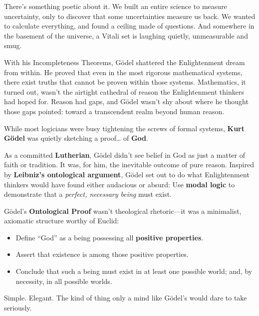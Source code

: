 There’s something poetic about it. We built an entire science to measure uncertainty, only to discover that some uncertainties measure us back. We wanted to calculate everything, and found a ceiling made of questions. And somewhere in the basement of the universe, a Vitali set is laughing quietly, unmeasurable and smug.

With his Incompleteness Theorems, Gödel shattered the Enlightenment dream from within. He proved that even in the most rigorous mathematical systems, there exist truths that cannot be proven within those systems. Mathematics, it turned out, wasn’t the airtight cathedral of reason the Enlightenment thinkers had hoped for. Reason had gaps, and Gödel wasn’t shy about where he thought those gaps pointed: toward a transcendent realm beyond human reason.

\begin{tcolorbox}[colback=blue!5!white, colframe=blue!50!black, title=Historical Sidebar: Truth vs Games]

While most logicians were busy tightening the screws of formal systems, \textbf{Kurt Gödel} was quietly sketching a proof\ldots{} of \textbf{God}.

\medskip

As a committed \textbf{Lutherian}, Gödel didn’t see belief in God as just a matter of faith or tradition. It was, for him, the inevitable outcome of pure reason. Inspired by \textbf{Leibniz’s ontological argument}, Gödel set out to do what Enlightenment thinkers would have found either audacious or absurd: Use \textbf{modal logic} to demonstrate that a \emph{perfect, necessary being} must exist.

\medskip

Gödel’s \textbf{Ontological Proof} wasn’t theological rhetoric—it was a minimalist, axiomatic structure worthy of Euclid:

\medskip

\begin{itemize}
    \item Define ``God'' as a being possessing all \textbf{positive properties}.
    \item Assert that existence is among those positive properties.
    \item Conclude that such a being must exist in at least one possible world; and, by necessity, in all possible worlds.
\end{itemize}

\medskip

Simple. Elegant. The kind of thing only a mind like Gödel’s would dare to take seriously.


\end{tcolorbox}
